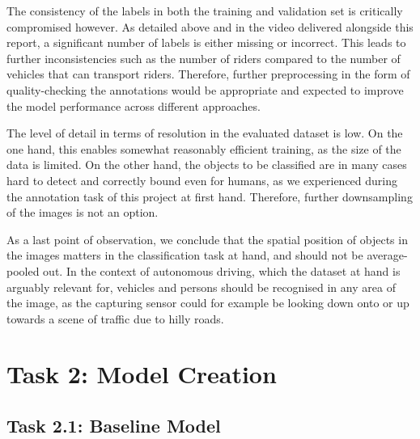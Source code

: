 \documentclass{article}
\begin{document}
The consistency of the labels in both the training and validation set is critically compromised however. As detailed above and in the video delivered alongside this report, a significant number of labels is either missing or incorrect. This leads to further inconsistencies such as the number of riders compared to the number of vehicles that can transport riders. Therefore, further preprocessing in the form of quality-checking the annotations would be appropriate and expected to improve the model performance across different approaches.

The level of detail in terms of resolution in the evaluated dataset is low. On the one hand, this enables somewhat reasonably efficient training, as the size of the data is limited. On the other hand, the objects to be classified are in many cases hard to detect and correctly bound even for humans, as we experienced during the annotation task of this project at first hand. Therefore, further downsampling of the images is not an option.

As a last point of observation, we conclude that the spatial position of objects in the images matters in the classification task at hand, and should not be average-pooled out. In the context of autonomous driving, which the dataset at hand is arguably relevant for, vehicles and persons should be recognised in any area of the image, as the capturing sensor could for example be looking down onto or up towards a scene of traffic due to hilly roads.

\section*{Task 2: Model Creation}

\subsection*{Task 2.1: Baseline Model}
\end{document}
